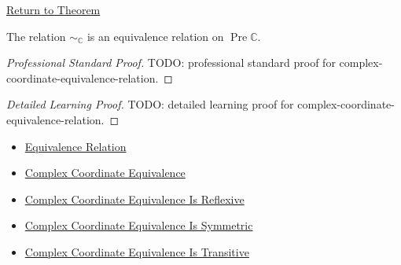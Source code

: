 \newpage
{}
\label{prf:complex-coordinate-equivalence-relation}

\begin{remark*}[Return]
\hyperref[thm:complex-coordinate-equivalence-relation]{Return to Theorem}
\end{remark*}

\begin{theorem*}
The relation $\sim_{\mathbb{C}}$ is an equivalence relation on
\(\operatorname{Pre}\mathbb{C}\).
\end{theorem*}

\begin{proof}[Professional Standard Proof]
\LRAProofBodyStart
TODO: professional standard proof for complex-coordinate-equivalence-relation.
\end{proof}

\begin{proof}[Detailed Learning Proof]
\LRAProofBodyStart
TODO: detailed learning proof for complex-coordinate-equivalence-relation.
\end{proof}

\begin{remark*}
\end{remark*}

\begin{dependencies}
\begin{itemize}
  \item \hyperref[def:equivalence-relation]{Equivalence Relation}
  \item \hyperref[def:complex-coordinate-equivalence]{Complex Coordinate Equivalence}
  \item \hyperref[lem:complex-coordinate-equivalence-reflexive]{Complex Coordinate Equivalence Is Reflexive}
  \item \hyperref[lem:complex-coordinate-equivalence-symmetric]{Complex Coordinate Equivalence Is Symmetric}
  \item \hyperref[lem:complex-coordinate-equivalence-transitive]{Complex Coordinate Equivalence Is Transitive}
\end{itemize}
\end{dependencies}

\clearpage
